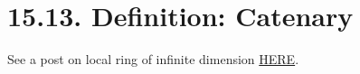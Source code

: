 
\section{15.13. Definition: Catenary}

See a post on local ring of infinite dimension \href{https://mathoverflow.net/questions/310838/local-ring-of-infinite-dimension}{HERE}.